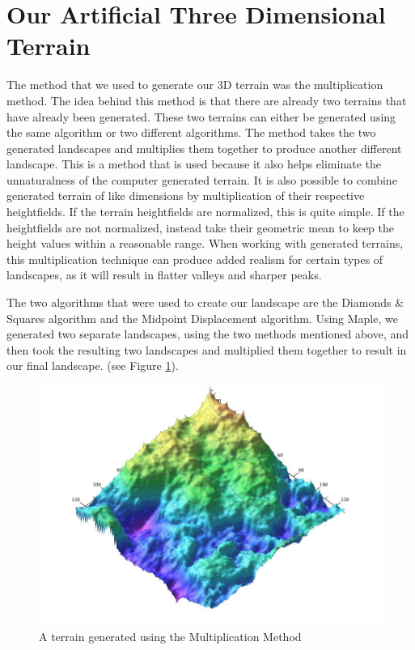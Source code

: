 \documentclass[11pt,twocolumn]{article}
\begin{document}
	\section{Our Artificial Three Dimensional Terrain}
	\label{sec:ourterrain}
	The method that we used to generate our 3D terrain was the multiplication method. The idea behind this method is that there are already two terrains that have already been generated. These two terrains can either be generated using the same algorithm or two different algorithms. The method takes the two generated landscapes and multiplies them together to produce another different landscape. This is a method that is used because it also helps eliminate the unnaturalness of the computer generated terrain.
	It is also possible to combine generated terrain of like dimensions by multiplication of their respective heightfields.
	If the terrain heightfields are normalized, this is quite simple. If the heightfields are not normalized, instead
	take their geometric mean to keep the height values within a reasonable range. When working with generated terrains, this
	multiplication technique can produce added realism for certain types of landscapes, as it will result in flatter valleys and
	sharper peaks. 	
	
	The two algorithms that were used to create our landscape are the Diamonds \& Squares algorithm and the Midpoint Displacement algorithm. Using Maple, we generated two separate landscapes, using the two methods mentioned above, and then took the resulting two landscapes and multiplied them together to result in our final landscape.
(see Figure \ref{fig:multiplication}). 

	\begin{figure}[ht]
	\includegraphics[scale=0.275]{multipliedterrain.jpg}
	\caption{A terrain generated using the Multiplication Method}
	\label{fig:multiplication}
	\end{figure}
\end{document}

